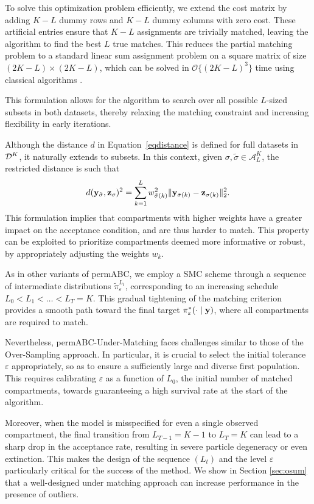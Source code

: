 To solve this optimization problem efficiently, we extend the cost matrix by adding \( K - L \) dummy rows and \( K - L \) dummy columns with zero cost. These artificial entries ensure that \( K - L \) assignments are trivially matched, leaving the algorithm to find the best \( L \) true matches. This reduces the partial matching problem to a standard linear sum assignment problem on a square matrix of size \( (2K - L) \times (2K - L) \), which can be solved in \( \mathcal{O}\{(2K-L)^3\} \) time using classical algorithms \citep{crouseImplementing2DRectangular2016a}. 
 

This formulation allows for the algorithm to search over all possible \( L \)-sized subsets in both datasets, thereby relaxing the matching constraint and increasing flexibility in early iterations.

Although the distance \( d \) in Equation~\eqref{eqdistance} is defined for full datasets in \( \mathcal{D}^K \), it naturally extends to subsets. In this context, given \( \sigma, \tilde \sigma \in \mathcal{A}_L^K \), the restricted distance is such that
\[
d(\mathbf{y}_{\tilde \sigma}, \mathbf{z}_{\sigma})^2 = {\sum_{k=1}^L w_{\tilde \sigma(k)}^2 \| \mathbf{y}_{\tilde \sigma(k)} - \mathbf{z}_{\sigma(k)} \|_2^2}.
\]
This formulation implies that compartments with higher weights have a greater impact on the acceptance condition, and are thus harder to match. This property can be exploited to prioritize compartments deemed more informative or robust, by appropriately adjusting the weights \( w_k \).

As in other variants of permABC, we employ a SMC scheme through a sequence of intermediate distributions \( \tilde{\pi}_\varepsilon^{L_t} \), corresponding to an increasing schedule \( L_0 < L_1 < \dots < L_T = K \). This gradual tightening of the matching criterion provides a smooth path toward the final target \( \pi^*_\varepsilon(\cdot \mid \mathbf{y}) \), where all compartments are required to match.

Nevertheless, permABC-Under-Matching faces challenges similar to those of the Over-Sampling approach. In particular, it is crucial to select the initial tolerance \( \varepsilon \) appropriately, so as to ensure a sufficiently large and diverse first population. This requires calibrating \( \varepsilon \) as a function of \( L_0 \), the initial number of matched compartments, towards guaranteeing a high survival rate at the start of the algorithm.

Moreover, when the model is misspecified for even a single observed compartment, the final transition from \( L_{T-1} = K - 1 \) to \( L_T = K \) can lead to a sharp drop in the acceptance rate, resulting in severe particle degeneracy or even extinction. This makes the design of the sequence \( (L_t) \) and the level \( \varepsilon \) particularly critical for the success of the method. 
We show in Section \ref{sec:osum} that a well-designed under matching approach can increase performance in the presence of outliers.

